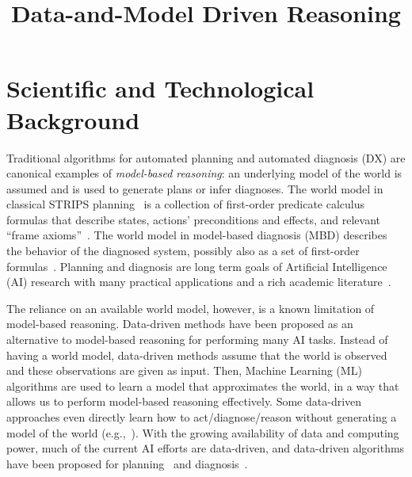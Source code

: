 \documentclass[12pt]{article}
\newcommand{\note}[1]{\textbf{\textit{#1}}}
\begin{document}
\title{Data-and-Model Driven Reasoning}


\section{Scientific and Technological Background}


Traditional algorithms for automated planning and automated diagnosis (DX) are canonical examples of {\em model-based reasoning}:
an underlying model of the world is assumed and is used to generate plans or infer diagnoses. The world model in classical STRIPS planning~\cite{fikes1971strips}
is a collection of first-order predicate calculus formulas that describe states, actions' preconditions and effects, and relevant ``frame axioms''~\cite{ghallab2004automated}. 
The world model in model-based diagnosis (MBD) describes the behavior of the diagnosed system, possibly also as a set of first-order formulas~\cite{reiter1987theory,deKleer1987diagnosing}. 
Planning and diagnosis are long term goals of Artificial Intelligence (AI) research with many practical applications and a rich academic literature~\cite{abreu2011simultaneousDebugging,fox2011automatic,niggemann10model,williams96,robinson2014cost,ruml2011line,Zamir2014UsingMD}. 



The reliance on an available world model, however, is a known limitation of model-based reasoning. Data-driven methods have been proposed as an alternative to model-based reasoning for performing many AI tasks. %
Instead of having a world model, data-driven methods  assume that the world is observed and these observations are given as input. Then, Machine Learning (ML) algorithms are used to learn a model that approximates the world, in a way that allows us to perform model-based reasoning effectively. Some data-driven approaches even directly learn how to act/diagnose/reason without generating a model of the world (e.g.,~\cite{kearns2002POMDPsample}). 
With the growing availability of data and computing power, much of the current AI efforts are data-driven,
and data-driven algorithms have been proposed for  planning~\cite{fern2011first,juba2016jmlr} and diagnosis~\cite{keren2011model,qin2012survey}.
\end{document}
